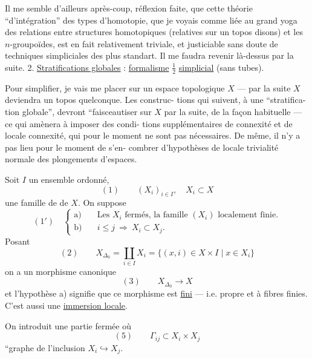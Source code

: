 Il me semble d'ailleurs après-coup,
réflexion faite, que cette théorie ``d'intégration''
des types d'homotopie, que 
je voyais comme liée au grand yoga des
relations entre structures homotopiques (relatives
sur un topos disons) et les $n$-groupoïdes,
est en fait relativement triviale, et
justiciable sans doute de techniques 
simpliciales des plus standart. Il me
faudra revenir là-dessus par la suite.
2. \uline{Stratifications globales} : \uline{formalisme} $\frac12$ \uline{simplicial}
(sans tubes).

Pour simplifier, je vais me placer sur un
espace topologique $X$ --- par la suite $X$
deviendra un topos quelconque. Les construc-
tions qui suivent,  à une ``stratifica-
tion globale'', devront ``faisceautiser sur $X$
par la suite, de la façon habituelle ---
ce qui amènera  à imposer des condi-
tions supplémentaires de connexité et
de locale connexité, qui pour le moment
ne sont pas nécessaires. De même, il n'y
a pas lieu pour le moment de s'en-
combrer d'hypothèses de locale trivialité
normale des plongements d'espaces.

Soit $I$ un ensemble ordonné, 
\[
(1)\qquad (X_i)_{i\in I},\quad X_i\subset X
\]
une famille de  de $X$. On suppose
\[
(1')\quad\left\{\begin{aligned}
\text{a)}\quad&\text{Les }X_i\text{ fermés, la famille }(X_i)\text{ localement finie.}\\
\text{b)}\quad&i\leq j\ \Longrightarrow\ X_i\subset X_j.
\end{aligned}\right.
\]
Posant
\[
(2)\qquad X_{\Delta_0}=\coprod_{i\in I}X_i
=\{(x,i)\in X\times I\mid x\in X_i\}
\]
on a un morphisme canonique
\[
(3)\qquad X_{\Delta_0}\longrightarrow X
\]
et l'hypothèse a) signifie que ce
morphisme  est \uline{fini} --- i.e. propre
 et à fibres finies. C'est aussi une
\uline{immersion locale}.

On introduit une partie fermée
où
\[
(5)\qquad \Gamma_{ij}\subset X_i\times X_j
\]
``graphe de l'inclusion $X_i\hookrightarrow X_j$.

